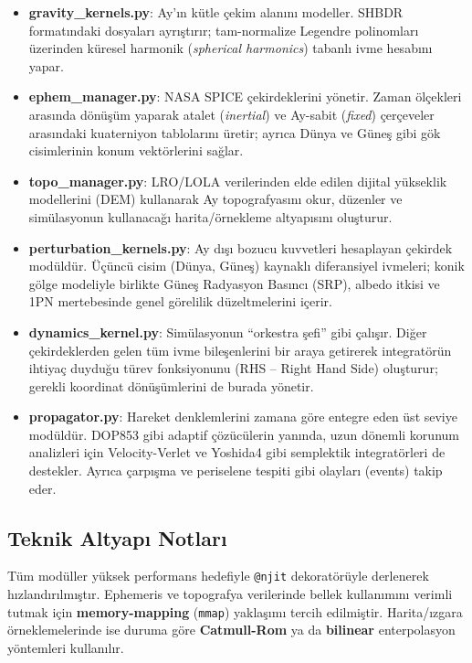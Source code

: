 \begin{itemize}
    \item \textbf{gravity\_kernels.py}: Ay’ın kütle çekim alanını modeller. SHBDR formatındaki dosyaları ayrıştırır; tam-normalize Legendre polinomları üzerinden küresel harmonik (\emph{spherical harmonics}) tabanlı ivme hesabını yapar.

    \item \textbf{ephem\_manager.py}: NASA SPICE çekirdeklerini yönetir. Zaman ölçekleri arasında dönüşüm yaparak atalet (\emph{inertial}) ve Ay-sabit (\emph{fixed}) çerçeveler arasındaki kuaterniyon tablolarını üretir; ayrıca Dünya ve Güneş gibi gök cisimlerinin konum vektörlerini sağlar.

    \item \textbf{topo\_manager.py}: LRO/LOLA verilerinden elde edilen dijital yükseklik modellerini (DEM) kullanarak Ay topografyasını okur, düzenler ve simülasyonun kullanacağı harita/örnekleme altyapısını oluşturur.

    \item \textbf{perturbation\_kernels.py}: Ay dışı bozucu kuvvetleri hesaplayan çekirdek modüldür. Üçüncü cisim (Dünya, Güneş) kaynaklı diferansiyel ivmeleri; konik gölge modeliyle birlikte Güneş Radyasyon Basıncı (SRP), albedo itkisi ve 1PN mertebesinde genel görelilik düzeltmelerini içerir.

    \item \textbf{dynamics\_kernel.py}: Simülasyonun “orkestra şefi” gibi çalışır. Diğer çekirdeklerden gelen tüm ivme bileşenlerini bir araya getirerek integratörün ihtiyaç duyduğu türev fonksiyonunu (RHS -- Right Hand Side) oluşturur; gerekli koordinat dönüşümlerini de burada yönetir.

    \item \textbf{propagator.py}: Hareket denklemlerini zamana göre entegre eden üst seviye modüldür. DOP853 gibi adaptif çözücülerin yanında, uzun dönemli korunum analizleri için Velocity-Verlet ve Yoshida4 gibi semplektik integratörleri de destekler. Ayrıca çarpışma ve periselene tespiti gibi olayları (events) takip eder.
\end{itemize}

\subsection*{Teknik Altyapı Notları}
Tüm modüller yüksek performans hedefiyle \texttt{@njit} dekoratörüyle derlenerek hızlandırılmıştır. Ephemeris ve topografya verilerinde bellek kullanımını verimli tutmak için \textbf{memory-mapping} (\texttt{mmap}) yaklaşımı tercih edilmiştir. Harita/ızgara örneklemelerinde ise duruma göre \textbf{Catmull-Rom} ya da \textbf{bilinear} enterpolasyon yöntemleri kullanılır.



